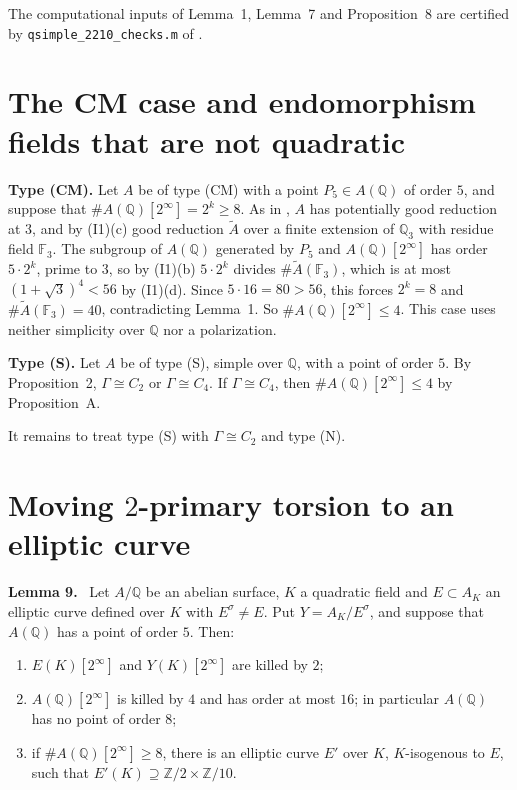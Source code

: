 \documentclass[11pt]{article}
\newenvironment{statement}[1]{\par\medskip\noindent\phantomsection\textbf{#1}\ }{\par\medskip}
\newcommand{\Q}{\mathbb Q}
\newcommand{\Z}{\mathbb Z}
\newcommand{\F}{\mathbb F}
\begin{document}
The computational inputs of Lemma~1, Lemma~7 and Proposition~8 are certified by
\texttt{qsimple\_2210\_checks.m} of \cite{P2210}.

\section{The CM case and endomorphism fields that are not quadratic}\label{other}

\textbf{Type (CM).} Let \(A\) be of type (CM) with a point \(P_5\in A(\Q)\) of order \(5\), and suppose
that \(\#A(\Q)[2^\infty]=2^k\ge8\). As in \cite[Section~2]{P2210}, \(A\) has potentially good reduction
at \(3\), and by (I1)(c) good reduction \(\widetilde A\) over a finite extension of \(\Q_3\) with
residue field \(\F_3\). The subgroup of \(A(\Q)\) generated by \(P_5\) and \(A(\Q)[2^\infty]\) has order
\(5\cdot2^k\), prime to \(3\), so by (I1)(b) \(5\cdot2^k\) divides \(\#\widetilde A(\F_3)\), which is at
most \((1+\sqrt3)^4<56\) by (I1)(d). Since \(5\cdot16=80>56\), this forces \(2^k=8\) and
\(\#\widetilde A(\F_3)=40\), contradicting Lemma~1. So \(\#A(\Q)[2^\infty]\le4\). This case uses neither
simplicity over \(\Q\) nor a polarization.

\textbf{Type (S).} Let \(A\) be of type (S), simple over \(\Q\), with a point of order \(5\). By
Proposition~2, \(\Gamma\cong C_2\) or \(\Gamma\cong C_4\). If \(\Gamma\cong C_4\), then
\(\#A(\Q)[2^\infty]\le4\) by Proposition~A.

It remains to treat type (S) with \(\Gamma\cong C_2\) and type (N).

\section{Moving \(2\)-primary torsion to an elliptic curve}\label{lemma}

\begin{statement}{Lemma 9.}\label{lemma-4prime}
Let \(A/\Q\) be an abelian surface, \(K\) a quadratic field and \(E\subset A_K\) an elliptic curve
defined over \(K\) with \(E^\sigma\neq E\). Put \(Y=A_K/E^\sigma\), and suppose that \(A(\Q)\) has a point
of order \(5\). Then:
\begin{enumerate}
\item[(a)] \(E(K)[2^\infty]\) and \(Y(K)[2^\infty]\) are killed by \(2\);
\item[(b)] \(A(\Q)[2^\infty]\) is killed by \(4\) and has order at most \(16\); in particular
\(A(\Q)\) has no point of order \(8\);
\item[(c)] if \(\#A(\Q)[2^\infty]\ge8\), there is an elliptic curve \(E'\) over \(K\), \(K\)-isogenous
to \(E\), such that \(E'(K)\supseteq\Z/2\times\Z/10\).
\end{enumerate}
\end{statement}
\end{document}
